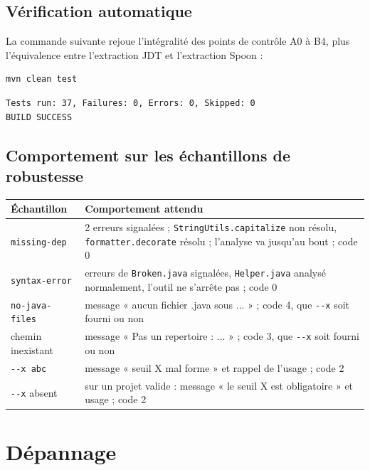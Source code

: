 \documentclass[11pt,a4paper]{article}
\begin{document}
\subsection*{Vérification automatique}

La commande suivante rejoue l'intégralité des points de contrôle A0 à B4, plus l'équivalence entre l'extraction JDT et l'extraction Spoon :

\begin{lstlisting}[language=bash]
mvn clean test
\end{lstlisting}

\begin{lstlisting}
Tests run: 37, Failures: 0, Errors: 0, Skipped: 0
BUILD SUCCESS
\end{lstlisting}

\subsection*{Comportement sur les échantillons de robustesse}

\begin{table}[H]
\centering
\small
\begin{tabular}{@{}lp{9.5cm}@{}}
\toprule
\textbf{Échantillon} & \textbf{Comportement attendu} \\
\midrule
\texttt{missing-dep} & 2 erreurs signalées ; \texttt{StringUtils.capitalize} non résolu, \texttt{formatter.decorate} résolu ; l'analyse va jusqu'au bout ; code 0 \\
\texttt{syntax-error} & erreurs de \texttt{Broken.java} signalées, \texttt{Helper.java} analysé normalement, l'outil ne s'arrête pas ; code 0 \\
\texttt{no-java-files} & message « aucun fichier .java sous ... » ; code 4, que \texttt{-{}-x} soit fourni ou non \\
chemin inexistant & message « Pas un repertoire : ... » ; code 3, que \texttt{-{}-x} soit fourni ou non \\
\texttt{-{}-x abc} & message « seuil X mal forme » et rappel de l'usage ; code 2 \\
\texttt{-{}-x} absent & sur un projet valide : message « le seuil X est obligatoire » et usage ; code 2 \\
\bottomrule
\end{tabular}
\end{table}

\section{Dépannage}
\end{document}
